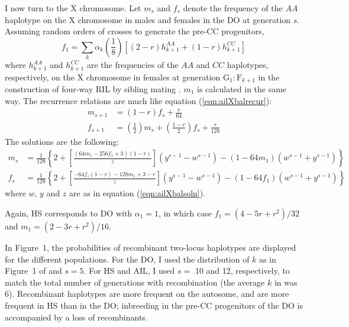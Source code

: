 \documentclass[12pt,letterpaper,pdftex]{article}
\begin{document}
I now turn to the X chromosome.  Let $m_s$ and $f_s$ denote the
frequency of the $AA$ haplotype on the X chromosome in males and
females in the DO at generation $s$.  Assuming random orders of
crosses to generate the pre-CC progenitors, 
\begin{equation}
f_1 = \textstyle{ \sum_k \alpha_k \left(\frac{1}{8}\right) \left[ (2-r) h_{k+1}^{AA} +
  (1-r) h_{k+1}^{CC} \right] }
\end{equation}
where $h_{k+1}^{AA}$ and $h_{k+1}^{CC}$ are the frequencies of the $AA$
and $CC$ haplotypes, respectively, on the X chromosome in females at
generation $\text{G}_1:\text{F}_{k+1}$ in the construction of four-way
RIL by sibling mating \citep[see][Table~4]{Broman2012}.  $m_1$ is
calculated in the same way.  The recurrence relations are much like
equation (\ref{eqn:ailXbalrecur}):
\begin{equation} \begin{split}
m_{s+1} & = \textstyle{ (1-r) f_s + \frac{r}{64} } \\[6pt]
f_{s+1} & = \textstyle{ \left(\frac{1}{2}\right)m_s + \left(\frac{1-r}{2}\right) f_s + \frac{r}{128} }
\end{split} \end{equation}
The solutions are the following:
\begin{equation} \begin{split}
m_s & = \textstyle{ \frac{1}{128} \left\{ 2 + \left[\frac{(64m_1 - 256f_1 + 3)(1-r)}{z}\right](y^{s-1} - w^{s-1})
 - (1-64m_1)(w^{s-1}+y^{s-1})\right\} } \\[6pt]
f_s & = \textstyle{ \frac{1}{128} \left\{ 2 + \left[\frac{-64f_1(1-r) -128m_1 + 3 - r}{z}\right](y^{s-1} - w^{s-1})
 - (1-64f_1)(w^{s-1}+y^{s-1})\right\} }
\end{split} \end{equation}
where $w$, $y$ and $z$ are as in equation (\ref{eqn:ailXbalsoln}).

Again, HS corresponds to DO with $\alpha_1 = 1$, in which case $f_1 =
(4-5r+r^2)/32$ and $m_1 = (2-3r+r^2)/16$.

In Figure~1, the probabilities of recombinant two-locus haplotypes are
displayed for the
different populations.  For the DO, I used the distribution of $k$ as
in Figure~1 of \citet{Svenson2012} and $s=5$.
For HS and AIL, I used $s=$ 10 and 12, respectively, to match the
total number of generations with recombination (the average $k$ in
\citet{Svenson2012} was 6).  Recombinant
haplotypes are more frequent on the autosome, and are more frequent in
HS than in the DO; inbreeding in the pre-CC progenitors of the DO is
accompanied by a loss of recombinants.
\end{document}

